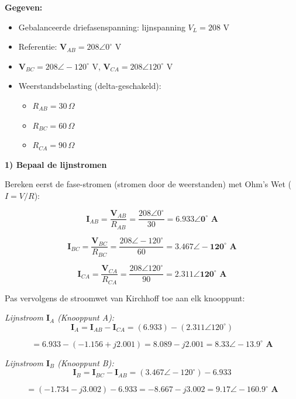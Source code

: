\documentclass[a4paper,11pt]{article}
\begin{document}
\begin{oefenblok}[title=Oefening: Onevenwichtige Delta-belasting met twee-wattmetermethode]

\textbf{Gegeven:}
\begin{itemize}
    \item Gebalanceerde driefasenspanning: lijnspanning $V_L = 208\text{ V}$
    \item Referentie: $\mathbf{V}_{AB} = 208 \angle 0^\circ \text{ V}$
    \item $\mathbf{V}_{BC} = 208 \angle -120^\circ \text{ V}$, $\mathbf{V}_{CA} = 208 \angle 120^\circ \text{ V}$
    \item Weerstandsbelasting (delta-geschakeld):
    \begin{itemize}
        \item $R_{AB} = 30\,\Omega$
        \item $R_{BC} = 60\,\Omega$
        \item $R_{CA} = 90\,\Omega$
    \end{itemize}
\end{itemize}

\noindent\textbf{1) Bepaal de lijnstromen}

Bereken eerst de fase-stromen (stromen door de weerstanden) met Ohm's Wet ($I = V/R$):

$$\mathbf{I}_{AB} = \frac{\mathbf{V}_{AB}}{R_{AB}} = \frac{208 \angle 0^\circ}{30} = \mathbf{6.933 \angle 0^\circ \text{ A}}$$

$$\mathbf{I}_{BC} = \frac{\mathbf{V}_{BC}}{R_{BC}} = \frac{208 \angle -120^\circ}{60} = \mathbf{3.467 \angle -120^\circ \text{ A}}$$

$$\mathbf{I}_{CA} = \frac{\mathbf{V}_{CA}}{R_{CA}} = \frac{208 \angle 120^\circ}{90} = \mathbf{2.311 \angle 120^\circ \text{ A}}$$

Pas vervolgens de stroomwet van Kirchhoff toe aan elk knooppunt:

\textit{Lijnstroom $\mathbf{I}_A$ (Knooppunt A):}
$$\mathbf{I}_A = \mathbf{I}_{AB} - \mathbf{I}_{CA} = (6.933) - (2.311 \angle 120^\circ)$$

$$= 6.933 - (-1.156 + j2.001) = 8.089 - j2.001 = \boxed{\mathbf{8.33 \angle -13.9^\circ \text{ A}}}$$

\textit{Lijnstroom $\mathbf{I}_B$ (Knooppunt B):}
$$\mathbf{I}_B = \mathbf{I}_{BC} - \mathbf{I}_{AB} = (3.467 \angle -120^\circ) - 6.933$$

$$= (-1.734 - j3.002) - 6.933 = -8.667 - j3.002 = \boxed{\mathbf{9.17 \angle -160.9^\circ \text{ A}}}$$


\end{oefenblok}
\end{document}
